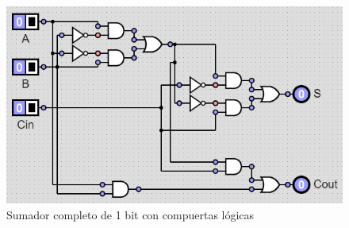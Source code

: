 \documentclass[journal]{IEEEtran}
\begin{document}
	\begin{figure}[!htb]
		\centering
		\includegraphics[scale = 0.5]{img/SC1B.png}
		\caption{Sumador completo de 1 bit con compuertas lógicas}
		\label{fig:SC1B}
	\end{figure}
	
	\begin{table}[!htb]
		\centering
		\caption{Tabla de verdad sumador completo de 2 bits}
		\label{tab:TVSC2B}
	\end{table}
	
\end{document}
